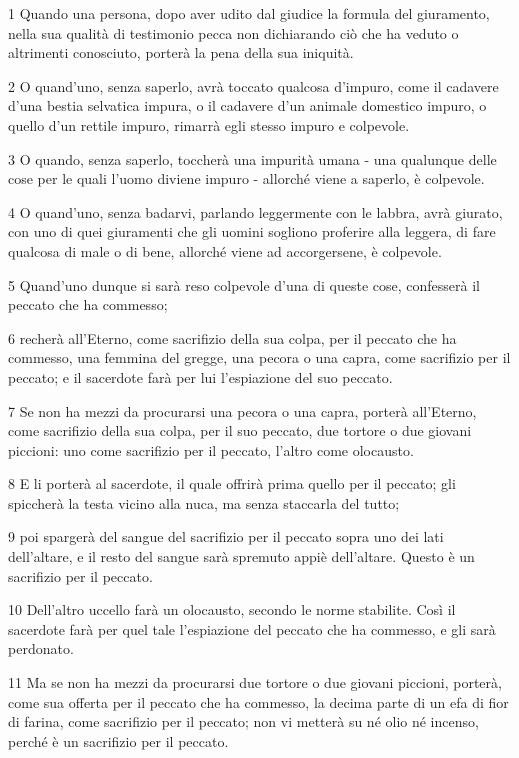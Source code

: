 \par 1 Quando una persona, dopo aver udito dal giudice la formula del giuramento, nella sua qualità di testimonio pecca non dichiarando ciò che ha veduto o altrimenti conosciuto, porterà la pena della sua iniquità.
\par 2 O quand'uno, senza saperlo, avrà toccato qualcosa d'impuro, come il cadavere d'una bestia selvatica impura, o il cadavere d'un animale domestico impuro, o quello d'un rettile impuro, rimarrà egli stesso impuro e colpevole.
\par 3 O quando, senza saperlo, toccherà una impurità umana - una qualunque delle cose per le quali l'uomo diviene impuro - allorché viene a saperlo, è colpevole.
\par 4 O quand'uno, senza badarvi, parlando leggermente con le labbra, avrà giurato, con uno di quei giuramenti che gli uomini sogliono proferire alla leggera, di fare qualcosa di male o di bene, allorché viene ad accorgersene, è colpevole.
\par 5 Quand'uno dunque si sarà reso colpevole d'una di queste cose, confesserà il peccato che ha commesso;
\par 6 recherà all'Eterno, come sacrifizio della sua colpa, per il peccato che ha commesso, una femmina del gregge, una pecora o una capra, come sacrifizio per il peccato; e il sacerdote farà per lui l'espiazione del suo peccato.
\par 7 Se non ha mezzi da procurarsi una pecora o una capra, porterà all'Eterno, come sacrifizio della sua colpa, per il suo peccato, due tortore o due giovani piccioni: uno come sacrifizio per il peccato, l'altro come olocausto.
\par 8 E li porterà al sacerdote, il quale offrirà prima quello per il peccato; gli spiccherà la testa vicino alla nuca, ma senza staccarla del tutto;
\par 9 poi spargerà del sangue del sacrifizio per il peccato sopra uno dei lati dell'altare, e il resto del sangue sarà spremuto appiè dell'altare. Questo è un sacrifizio per il peccato.
\par 10 Dell'altro uccello farà un olocausto, secondo le norme stabilite. Così il sacerdote farà per quel tale l'espiazione del peccato che ha commesso, e gli sarà perdonato.
\par 11 Ma se non ha mezzi da procurarsi due tortore o due giovani piccioni, porterà, come sua offerta per il peccato che ha commesso, la decima parte di un efa di fior di farina, come sacrifizio per il peccato; non vi metterà su né olio né incenso, perché è un sacrifizio per il peccato.
